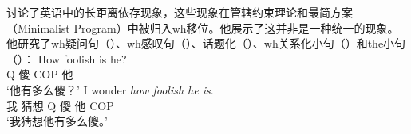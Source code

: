 \begin{exe}
\begin{xlist}[iv.]
\begin{exe}
\begin{xlist}[iv.]
\citet{Sag2010b}讨论了英语中的长距离依存现象，这些现象在管辖约束理论和最简方案\indexmpc（Minimalist Program）中被归入wh移位。他展示了这并非是一种统一的现象。他研究了wh疑问句（）、wh感叹句（）、话题化（）、wh关系化小句（）和the小句（）：
\eal
\ex
\gll How foolish is he?\\
     Q 傻 COP 他\\
\glt `他有多么傻？' 
\ex
\gll I wonder \emph{how foolish he is}.\\
     我 猜想 Q 傻 他 COP\\
\glt `我猜想他有多么傻。'
\zl


\end{xlist}
\end{exe}
\end{xlist}
\end{exe}

